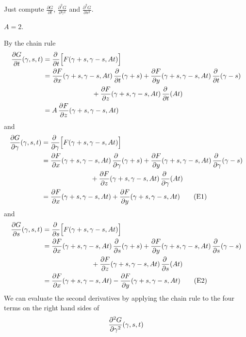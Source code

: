 \begin{hint}
Just compute $\frac{\partial G}{\partial t}$, 
$\frac{\partial^2 G}{\partial \gamma^2}$ and
$\frac{\partial^2 G}{\partial s^2}$.
\end{hint}

\begin{answer}
$A=2$.
\end{answer}

\begin{solution}
By the chain rule
\begin{align*}
\pdiff{G}{t}(\ga,s,t) 
  &= \pdiff{}{t} \Big[F (\gamma + s, \gamma-s, At)\Big] \\
  &=\pdiff{F}{x}(\gamma + s, \gamma-s, At)\, \pdiff{}{t}(\gamma + s)
   +\pdiff{F}{y}(\gamma + s, \gamma-s, At)\, \pdiff{}{t}(\gamma - s)
   \\&\hskip1in
   +\pdiff{F}{z}(\gamma + s, \gamma-s, At)\,\pdiff{}{t}(At) \\
  &= A\,\pdiff{F}{z}(\gamma + s, \gamma-s, At) 
\end{align*}
and
\begin{align*}
\pdiff{G}{\ga}(\ga,s,t) 
  &= \pdiff{}{\ga} \Big[F (\gamma + s, \gamma-s, At)\Big] \\
  &=\pdiff{F}{x}(\gamma + s, \gamma-s, At)\, \pdiff{}{\ga}(\gamma + s)
   +\pdiff{F}{y}(\gamma + s, \gamma-s, At)\, \pdiff{}{\ga}(\gamma - s)
   \\&\hskip1in
   +\pdiff{F}{z}(\gamma + s, \gamma-s, At)\,\pdiff{}{\ga}(At) \\
  &=  \pdiff{F}{x}(\gamma + s, \gamma-s, At)
                           +\pdiff{F}{y}(\gamma + s, \gamma-s, At)
\tag{E1} 
\end{align*}
and
\begin{align*}
\pdiff{G}{s}(\ga,s,t) 
  &= \pdiff{}{s} \Big[F (\gamma + s, \gamma-s, At)\Big] \\
  &=\pdiff{F}{x}(\gamma + s, \gamma-s, At)\, \pdiff{}{s}(\gamma + s)
   +\pdiff{F}{y}(\gamma + s, \gamma-s, At)\, \pdiff{}{s}(\gamma - s)
   \\&\hskip1in
   +\pdiff{F}{z}(\gamma + s, \gamma-s, At)\,\pdiff{}{s}(At) \\
&=  \pdiff{F}{x}(\gamma + s, \gamma-s, At)
                           -\pdiff{F}{y}(\gamma + s, \gamma-s, At)
\tag{E2} 
\end{align*}
We can evaluate the second derivatives by applying the chain rule
to the four terms on the right hand sides of
\begin{align*}
\frac{\partial^2G}{\partial\ga^2}(\ga,s,t)

\end{align*}
\end{solution}
